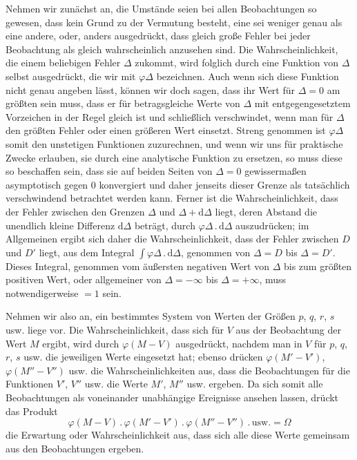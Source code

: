 Nehmen wir zunächst an, die Umstände seien bei allen Beobachtungen so gewesen, dass kein Grund zu der Vermutung besteht, eine sei weniger genau als eine andere, oder, anders ausgedrückt, dass gleich große Fehler bei jeder Beobachtung als gleich wahrscheinlich anzusehen sind. Die Wahrscheinlichkeit, die einem beliebigen Fehler $\Delta$ zukommt, wird folglich durch eine Funktion von $\Delta$ selbst ausgedrückt, die wir mit $\varphi\Delta$ bezeichnen. Auch wenn sich diese Funktion nicht genau angeben lässt, können wir doch sagen, dass ihr Wert für $\Delta=0$ am größten sein muss, dass er für betragsgleiche Werte von $\Delta$ mit entgegengesetztem Vorzeichen in der Regel gleich ist und schließlich verschwindet, wenn man für $\Delta$ den größten Fehler oder einen größeren Wert einsetzt. Streng genommen ist $\varphi\Delta$ somit den unstetigen Funktionen zuzurechnen, und wenn wir uns für praktische Zwecke erlauben, sie durch eine analytische Funktion zu ersetzen, so muss diese so beschaffen sein, dass sie auf beiden Seiten von $\Delta=0$ gewissermaßen asymptotisch gegen $0$ konvergiert und daher jenseits dieser Grenze als tatsächlich verschwindend betrachtet werden kann. Ferner ist die Wahrscheinlichkeit, dass der Fehler zwischen den Grenzen $\Delta$ und $\Delta+\mathrm{d}\Delta$ liegt, deren Abstand die unendlich kleine Differenz $\mathrm{d}\Delta$ beträgt, durch $\varphi\Delta\, .\,\mathrm{d}\Delta$ auszudrücken; im Allgemeinen ergibt sich daher die Wahrscheinlichkeit, dass der Fehler zwischen $D$ und $D'$ liegt, aus dem Integral $\int\varphi\Delta\, .\,\mathrm{d}\Delta$, genommen von $\Delta=D$ bis $\Delta=D'$. Dieses Integral, genommen vom äußersten negativen Wert von $\Delta$ bis zum größten positiven Wert, oder allgemeiner von $\Delta=-\infty$ bis $\Delta=+\infty$, muss notwendigerweise $=1$ sein.

Nehmen wir also an, ein bestimmtes System von Werten der Größen $p$, $q$, $r$, $s$ usw. liege vor. Die Wahrscheinlichkeit, dass sich für $V$ aus der Beobachtung der Wert $M$ ergibt, wird durch $\varphi(M-V)$ ausgedrückt, nachdem man in $V$ für $p$, $q$, $r$, $s$ usw. die jeweiligen Werte eingesetzt hat; ebenso drücken $\varphi(M'-V')$, $\varphi(M''-V'')$ usw. die Wahrscheinlichkeiten aus, dass die Beobachtungen für die Funktionen $V'$, $V''$ usw. die Werte $M'$, $M''$ usw. ergeben. Da sich somit alle Beobachtungen als voneinander unabhängige Ereignisse ansehen lassen, drückt das Produkt
\[
\varphi(M-V)\, .\,\varphi(M'-V')\, .\,\varphi(M''-V'')\, .\,\text{usw.}=\Omega
\]
die Erwartung oder Wahrscheinlichkeit aus, dass sich alle diese Werte gemeinsam aus den Beobachtungen ergeben.
